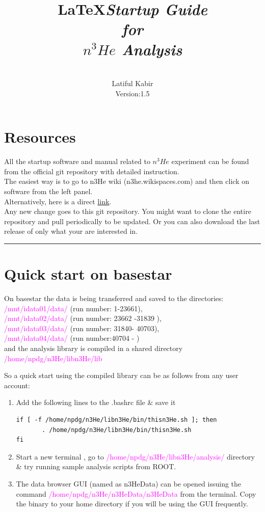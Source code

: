\documentclass[12pt]{article}
\title{\LaTeX}
\date{}
\title{\emph{\huge\textbf{Startup Guide \\ for \\$n^3He$ Analysis}}
}
\author{\\Latiful Kabir\\
Version:1.5
}
\begin{document}
  \maketitle
  
\newpage  
\tableofcontents
\newpage
\setcounter{tocdepth}{2}

\section{Resources}
All the startup software and manual related to $n^3He$ experiment can be found from the official git repository with detailed instruction. \\
The easiest way is to go to n3He wiki (n3he.wikispaces.com) and then click on software from the left panel.  \\
Alternatively, here is a direct \href{http://latifkabir.github.io/n3He_Soft/}{link}.\\
Any new change goes to this  git repository. You might want to clone the entire repository and pull periodically to be updated. Or you can also download the last release of only what your are interested in.  

\noindent
{\color{red} \rule{\linewidth}{1mm} }
 
\newpage
\section{Quick start on basestar}
On basestar the data is being transferred and saved to the directories: \\ \textcolor{magenta}{ /mnt/idata01/data/ } (run number: 1-23661),\\ \textcolor{magenta}{ /mnt/idata02/data/ } (run number: 23662 -31839 ),\\ \textcolor{magenta}{ /mnt/idata03/data/ } (run number: 31840- 40703),\\ \textcolor{magenta}{ /mnt/idata04/data/ } (run number:40704 - )\\and the analysis library is compiled in a shared directory \textcolor{magenta}{ /home/npdg/n3He/libn3He/lib} 

So a quick start using the compiled library can be as follows from any user account:

\begin{enumerate}
  \item Add the following lines to the .bashrc file \& save it
 
\begin{lstlisting}
if [ -f /home/npdg/n3He/libn3He/bin/thisn3He.sh ]; then
       . /home/npdg/n3He/libn3He/bin/thisn3He.sh
fi
\end{lstlisting}

 \item Start a new terminal , go to  \textcolor{magenta} { /home/npdg/n3He/libn3He/analysis/ }directory \& try running sample analysis scripts from ROOT.
 \item The data browser GUI (named as n3HeData) can be opened issuing the command\textcolor{magenta}{ /home/npdg/n3He/n3HeData/n3HeData } from the terminal. Copy the binary to your home directory if you will be using the GUI frequently.
\end{enumerate}
\end{document}
